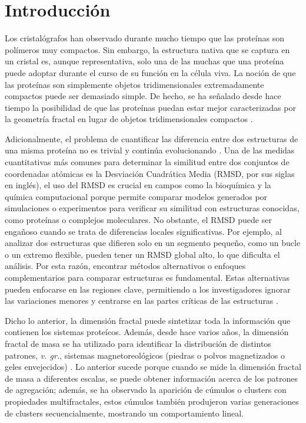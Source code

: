 \documentclass[11pt]{article}
\begin{document}
\clearpage

\section{Introducci\'{o}n}

Los cristal\'{o}grafos han observado durante mucho tiempo que las prote\'{i}nas son pol\'{i}meros muy compactos. Sin embargo, la estructura nativa que se captura en un cristal es, aunque representativa, solo  una de las muchas que una prote\'{i}na puede adoptar durante el curso de su funci\'{o}n en la c\'{e}lula viva. La noci\'{o}n de que las prote\'{i}nas son simplemente objetos tridimensionales extremadamente compactos puede ser demasiado simple. De hecho, se ha señalado desde hace tiempo la posibilidad de que las prote\'{i}nas puedan estar mejor caracterizadas por la geometr\'{i}a fractal en lugar de objetos tridimensionales compactos \cite{Enright2005}.

Adicionalmente, el problema de cuantificar las diferencia entre dos estructuras de una misma prote\'{i}na no es trivial y contin\'{u}a evolucionando \cite{Kufareva2012}. Una de las medidas 
cuantitativas m\'{a}s comunes para determinar la similitud entre 
dos conjuntos de coordenadas at\'{o}micas es la Desviaci\'{o}n Cuadr\'{a}tica Media 
(RMSD, por sus siglas en ingl\'{e}s), el uso del RMSD es crucial en campos como la bioqu\'{i}mica 
y la qu\'{i}mica computacional porque permite comparar modelos generados por 
simulaciones o experimentos para verificar su similitud con estructuras 
conocidas, como prote\'{i}nas o complejos moleculares. 
No obstante, el RMSD puede ser engañoso cuando se trata de diferencias
 locales significativas. Por ejemplo, al analizar dos estructuras que difieren solo 
 en un segmento pequeño, como un bucle o un extremo flexible, pueden tener 
 un RMSD global alto, lo que dificulta el an\'{a}lisis. Por esta raz\'{o}n, encontrar
  m\'{e}todos alternativos o enfoques complementarios para comparar estructuras 
  es fundamental. Estas alternativas pueden enfocarse en las regiones clave,
   permitiendo a los investigadores ignorar las variaciones menores y 
  centrarse en las partes cr\'{i}ticas de las estructuras \cite{Kufareva2012}.

Dicho lo anterior, la dimensi\'{o}n fractal puede sintetizar toda la informaci\'{o}n que contienen los sistemas prote\'{i}cos. Adem\'{a}s, desde hace varios años, la dimensi\'{o}n fractal de masa se ha utilizado para identificar la distribuci\'{o}n de distintos patrones, \textit{v. gr.}, sistemas magnetoreol\'{o}gicos (piedras o polvos magnetizados o geles envejecidos) \cite{Carrillo2003}. Lo anterior sucede porque cuando se mide la dimensi\'{o}n fractal de masa a diferentes escalas, se puede obtener  informaci\'{o}n acerca de los patrones de agregaci\'{o}n; adem\'{a}s, se ha observado la aparici\'{o}n de c\'{u}mulos o clusters con propiedades multifractales, estos c\'{u}mulos tambi\'{e}n produjeron varias generaciones de clusters secuencialmente, mostrando un comportamiento lineal.
\end{document}
